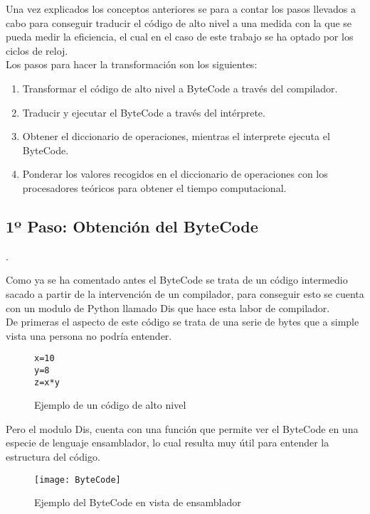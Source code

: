 Una vez explicados los conceptos anteriores se para a contar los pasos llevados a cabo para conseguir traducir el código de alto nivel a una medida con la que se pueda medir la eficiencia,  el cual en el caso de este trabajo se ha optado por los ciclos de reloj.\\
Los pasos para hacer la transformación son los siguientes:\\
\begin{enumerate}
	\item Transformar el código de alto nivel a ByteCode a través del compilador.
	\item Traducir y ejecutar el ByteCode a través del intérprete.
	\item Obtener el diccionario de operaciones, mientras el interprete ejecuta el ByteCode.
	\item Ponderar los valores recogidos en el diccionario de operaciones con los procesadores teóricos para obtener el tiempo computacional.
\end{enumerate}


\subsection{1º Paso: Obtención del ByteCode}.

Como ya se ha  comentado antes el ByteCode se trata  de un código intermedio sacado  a partir de la intervención de un compilador, para conseguir esto se cuenta con un modulo de Python llamado Dis que hace esta labor de compilador.\\
De primeras el aspecto de este código se trata de una serie de bytes que a simple vista una persona no podría entender.\\


\begin{figure}[H]
\centering
\begin{BVerbatim}
x=10
y=8
z=x*y
\end{BVerbatim}
\caption{Ejemplo de un código de alto nivel}
\end{figure}

Pero el modulo Dis, cuenta con una función que permite ver el ByteCode en una especie de lenguaje ensamblador, lo cual resulta muy útil para entender la estructura del código.\\

\begin{figure}[H]
\centering
\texttt{[image: ByteCode]}
\caption{Ejemplo del ByteCode en vista de ensamblador}
\end{figure}

